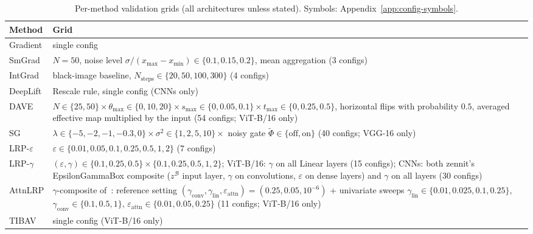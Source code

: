 \documentclass[twoside]{article}
\newcommand{\1}{\mathbf{1}}
\begin{document}
\begin{table}[H]
    \centering
    \caption{Per-method validation grids (all architectures unless stated). Symbols:
    Appendix~\ref{app:config-symbols}.}
    \label{tab:main-search-grid}
    \small
    \renewcommand{\arraystretch}{1.15}
    \begin{tabular}{@{}l p{}@{}}
        \toprule
        Method & Grid \\
        \midrule
        Gradient & single config \\
        SmGrad & $N{=}50$, noise level $\sigma/(x_{\max}{-}x_{\min}) \in \{0.1, 0.15, 0.2\}$, mean
        aggregation \quad (3 configs) \\
        IntGrad & black-image baseline, $N_{\text{steps}} \in \{20, 50, 100, 300\}$ \quad (4 configs) \\
        DeepLift & Rescale rule, single config \quad (CNNs only) \\
        DAVE & $N \in \{25, 50\} \times \theta_{\max} \in \{0, 10, 20\} \times s_{\max} \in \{0, 0.05,
            0.1\} \times t_{\max} \in \{0, 0.25, 0.5\}$, horizontal flips with probability $0.5$, averaged
        effective map multiplied by the input \quad (54 configs; ViT-B/16 only) \\
        SG & $\lambda \in \{-5, -2, -1, -0.3, 0\} \times \sigma^2 \in \{1, 2, 5, 10\} \times$ noisy gate
        $\tilde\Phi \in \{\text{off}, \text{on}\}$ \quad (40 configs; VGG-16 only) \\
        LRP-$\varepsilon$ & $\varepsilon \in \{0.01, 0.05, 0.1, 0.25, 0.5, 1, 2\}$ \quad (7 configs) \\
        LRP-$\gamma$ & $(\varepsilon, \gamma) \in \{0.1, 0.25, 0.5\}\times\{0.1, 0.25, 0.5, 1, 2\}$;
        ViT-B/16: $\gamma$ on all Linear layers (15 configs); CNNs: both zennit's EpsilonGammaBox composite
        ($z^{\mathcal{B}}$ input layer, $\gamma$ on convolutions, $\varepsilon$ on dense layers) and
        $\gamma$ on all layers (30 configs) \\
        AttnLRP & $\gamma$-composite of~\citet{achtibat2024attnlrp}: reference setting
        $(\gamma_{\text{conv}}, \gamma_{\text{lin}}, \varepsilon_{\text{attn}}){=}(0.25, 0.05, 10^{-6})$ +
        univariate sweeps $\gamma_{\text{lin}}\!\in\!\{0.01, 0.025, 0.1, 0.25\}$,
        $\gamma_{\text{conv}}\!\in\!\{0.1, 0.5, 1\}$, $\varepsilon_{\text{attn}}\!\in\!\{0.01, 0.05,
            0.25\}$ \quad (11 configs; ViT-B/16 only) \\
        TIBAV & single config \quad (ViT-B/16 only) \\

\end{tabular}
\end{table}
\end{document}
